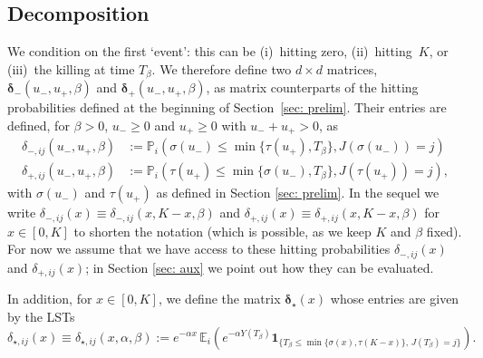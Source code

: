 \documentclass[reqno,12pt]{amsart}
\newcommand{\bs}{\boldsymbol}
\begin{document}
\subsection{Decomposition}\label{sec: decomposition}
We condition  on the first `event': this can be (i)~hitting zero, (ii)~hitting~$K$, or (iii)~the killing at time $T_{\beta}$. We therefore define two $d\times d$ matrices, $\bs{\delta}_-(u_-, u_+, \beta)$ and $\bs{\delta}_+(u_-, u_+, \beta)$, as matrix counterparts of the hitting probabilities defined at the beginning of Section~\ref{sec: prelim}. Their entries are defined, for $\beta > 0$, $u_- \geqslant0$ and $u_+\geqslant0$ with $u_-+u_+ > 0$, as
\begin{align*}
    \delta_{-,ij}(u_-, u_+, \beta) &:= \mathbb{P}_{i}\left(\sigma(u_-) \leqslant \min\{\tau(u_+), T_{\beta}\}, J(\sigma(u_-)) = j\right) \\
    \delta_{+,ij}(u_-, u_+, \beta) &:= \mathbb{P}_{i}\left(\tau(u_+) \leqslant \min\{\sigma (u_-), T_{\beta}\}, J(\tau(u_+)) = j\right),
\end{align*}
with $\sigma(u_-)$ and $\tau(u_+)$ as defined in Section \ref{sec: prelim}. In the sequel we  write $\delta_{-,ij}(x) \equiv \delta_{-,ij}(x, K-x, \beta)$ and $\delta_{+,ij}(x) \equiv \delta_{+,ij}(x, K-x, \beta)$ for $x\in[0,K]$ to shorten the notation (which is possible, as we keep $K$ and $\beta$ fixed). For now we assume that we have access to these hitting probabilities $\delta_{-,ij}(x)$ and $\delta_{+,ij}(x)$; in Section \ref{sec: aux} we point out how they can be evaluated.

In addition, for $x\in[0,K]$, we define the matrix
$\bs\delta_{\star}(x) $ 
whose entries are given by the LSTs
\begin{equation}
    \delta_{\star ,ij}(x) \equiv \delta_{\star, ij}(x,\alpha, \beta) := e^{-\alpha x}\,\mathbb{E}_i\left( e^{-\alpha Y(T_{\beta})}{\bs 1}_{\{T_{\beta} \leqslant \min\{\sigma(x), \tau(K-x)\},\,J(T_{\beta}) = j\}} \right).\label{eq: def delta star}
\end{equation}
\end{document}
